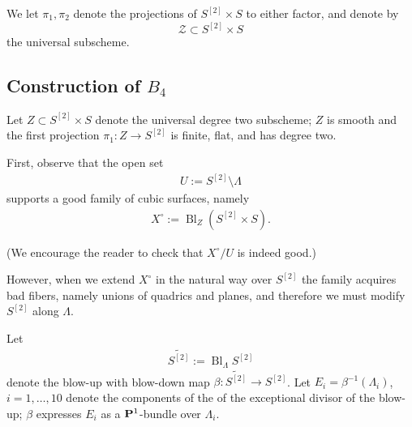 \documentclass[12pt,reqno]{amsart}
\DeclareMathOperator{\id}{id}
\DeclareMathOperator{\Bl}{Bl}
\renewcommand{\to}{{\longrightarrow}}
\numberwithin{equation}{section}
\newcommand{\td}{\widetilde}
\begin{document}
We let $\pi_{1}, \pi_{2}$ denote the projections of $S^{[2]} \times S$
to either factor, and denote by
$$\mathcal{Z} \subset S^{[2]} \times S$$ the universal subscheme. 

\subsection{Construction of $B_4$}
\label{sec:construction-b_4}

Let $Z \subset S^{[2]} \times S$ denote the universal degree two
subscheme; $Z$ is smooth and the first projection
$\pi_1 : Z \to S^{[2]}$ is finite, flat, and has degree two.


\begin{center}
\end{center}


First, observe that the open set
\begin{align} 
  \label{eq:UB3}
  U := S^{[2]} \setminus \Lambda
\end{align}
supports a good family of cubic surfaces, namely
\begin{align}
  \label{eq:XUB3}
  X^{\circ} := \Bl_{Z}(S^{[2]} \times S).
\end{align}

(We encourage the reader to check that $X^{\circ}/U$ is indeed good.)

However, when we extend $X^{\circ}$ in the natural way over $S^{[2]}$
the family acquires bad fibers, namely unions of quadrics and planes,
and therefore we must modify $S^{[2]}$ along $\Lambda$.

Let
\begin{align}
  \label{eq:S2tilde}
  \widetilde{S^{[2]}} := \Bl_{\Lambda}S^{[2]}
\end{align}
denote the blow-up with blow-down map
$\beta: \widetilde{S^{[2]}} \to S^{[2]}$.  Let
$E_{i} = \beta^{-1}(\Lambda_{i})$, $i=1, \dots, 10$ denote the
components of the of the exceptional divisor of the blow-up; $\beta$
expresses $E_{i}$ as a $\P^{1}$-bundle over $\Lambda_{i}$.
\end{document}
